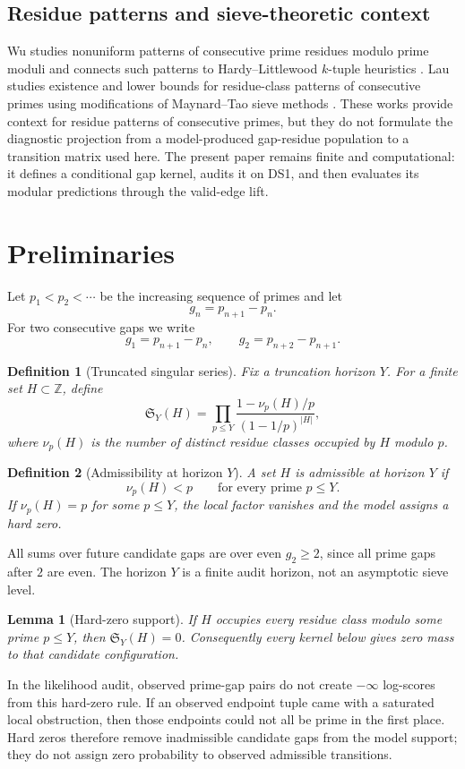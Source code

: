 \documentclass[10pt]{article}
\newtheorem{definition}{Definition}
\newtheorem{lemma}{Lemma}
\newcommand{\SY}{\mathfrak{S}_Y}
\begin{document}
\subsection{Residue patterns and sieve-theoretic context}
Wu studies nonuniform patterns of consecutive prime residues modulo prime moduli and connects such patterns to Hardy--Littlewood $k$-tuple heuristics \cite{wu2019}.  Lau studies existence and lower bounds for residue-class patterns of consecutive primes using modifications of Maynard--Tao sieve methods \cite{lau2024}.  These works provide context for residue patterns of consecutive primes, but they do not formulate the diagnostic projection from a model-produced gap-residue population to a transition matrix used here.  The present paper remains finite and computational: it defines a conditional gap kernel, audits it on DS1, and then evaluates its modular predictions through the valid-edge lift.

\section{Preliminaries}
Let $p_1<p_2<\cdots$ be the increasing sequence of primes and let
\[
g_n=p_{n+1}-p_n.
\]
For two consecutive gaps we write
\[
g_1=p_{n+1}-p_n,\qquad g_2=p_{n+2}-p_{n+1}.
\]

\begin{definition}[Truncated singular series]
Fix a truncation horizon $Y$.  For a finite set $H\subset\mathbb Z$, define
\[
\SY(H)=\prod_{p\le Y}\frac{1-\nu_p(H)/p}{(1-1/p)^{|H|}},
\]
where $\nu_p(H)$ is the number of distinct residue classes occupied by $H$ modulo $p$.
\end{definition}

\begin{definition}[Admissibility at horizon $Y$]
A set $H$ is admissible at horizon $Y$ if
\[
\nu_p(H)<p\qquad\text{for every prime }p\le Y.
\]
If $\nu_p(H)=p$ for some $p\le Y$, the local factor vanishes and the model assigns a hard zero.
\end{definition}

All sums over future candidate gaps are over even $g_2\ge2$, since all prime gaps after $2$ are even.  The horizon $Y$ is a finite audit horizon, not an asymptotic sieve level.

\begin{lemma}[Hard-zero support]
If $H$ occupies every residue class modulo some prime $p\le Y$, then $\SY(H)=0$.  Consequently every kernel below gives zero mass to that candidate configuration.
\end{lemma}
\noindent In the likelihood audit, observed prime-gap pairs do not create $-\infty$ log-scores from this hard-zero rule.  If an observed endpoint tuple came with a saturated local obstruction, then those endpoints could not all be prime in the first place.  Hard zeros therefore remove inadmissible candidate gaps from the model support; they do not assign zero probability to observed admissible transitions.
\end{document}
